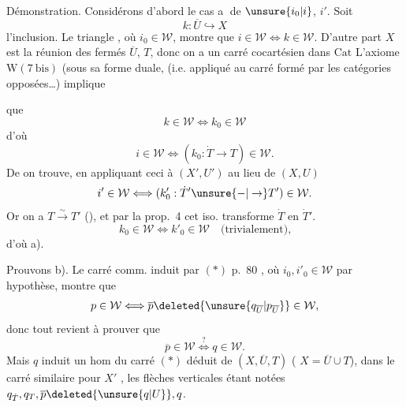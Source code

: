 Démonstration. Considérons d'abord le cas \textcircled{a} de
$\unsure{i_0|i}$, $i'$. Soit
\[
 k:\overline U\hookrightarrow X
\]
l'inclusion. Le triangle
, où $i_0\in\mathcal W$,
montre que $i\in\mathcal W\Longleftrightarrow k\in\mathcal W$. D'autre part $X$ est
la réunion des fermés $\overline U$, $T$, donc on a un
carré cocartésien dans $\mathrm{Cat}$
L'axiome $\mathrm W(7\ \mathrm{bis})$ (sous sa forme duale, (i.e. appliqué
au carré formé par les catégories opposées\ldots) implique


que
\[
 k\in\mathcal W\Longleftrightarrow k_0\in\mathcal W
\]
d'où
\[
 i\in\mathcal W\Longleftrightarrow(k_0:\dot T\to T)\in\mathcal W.
\]
De   on trouve, en appliquant ceci à
$(X',U')$ au lieu de $(X,U)$
\[
 i'\in\mathcal W\Longleftrightarrow(k'_0:\dot T'\unsure{-|\to}T')\in\mathcal W.
\]
Or on a $T\xrightarrow{\sim}T'$ (), et par la prop.~4
cet iso. transforme $\dot T$ en $\dot T'$. 
\[
 k_0\in\mathcal W\Longleftrightarrow k'_0\in\mathcal W\quad\text{(trivialement),}
\]
d'où a).

Prouvons b). Le carré comm. induit par $(*)$ p.~80
\noindent,
où $i_0,i'_0\in\mathcal W$ par hypothèse, montre que
\[
 p\in\mathcal W\Longleftrightarrow\overline p\deleted{\unsure{q_{\overline U}|p_{\overline U}}}\in\mathcal W,
\]
donc tout revient à prouver que
\[
 \overline p\in\mathcal W\overset{?}{\Longleftrightarrow}q\in\mathcal W.
\]
Mais $q$ induit un hom du carré $(*)$ déduit
de  $(X,\overline U,T)$ ( $X=\overline U\cup T$), dans le
carré similaire pour $X'$
\noindent,
les flèches verticales étant notées $q_{\dot T},q_T,\overline p\deleted{\unsure{q|U}},q$.

